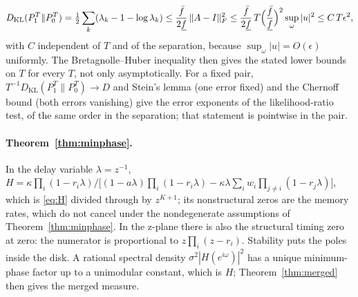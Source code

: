 \documentclass[12pt]{article}
\theoremstyle{definition}
\theoremstyle{remark}
\newcommand{\KL}{D_{\mathrm{KL}}}
\begin{document}
\[
\KL(P_1^T\|P_0^T)=\tfrac12\sum_k(\lambda_k-1-\log\lambda_k)\le\frac{\bar f}{2\underline f}\,\|A-I\|_F^2\le\frac{\bar f}{2\underline f}\,T\Bigl(\frac{\bar f}{\underline f}\Bigr)^2\sup_\omega|u|^2\le C\,T\epsilon^2,
\]
with $C$ independent of $T$ and of the separation, because $\sup_\omega|u|=O(\epsilon)$ uniformly. The Bretagnolle--Huber inequality \citep[Lemma 2.6]{tsybakov2009} then gives the stated lower bounds on $T$ for every $T$, not only asymptotically. For a fixed pair, $T^{-1}\KL(P_1^T\|P_0^T)\to D$ and Stein's lemma (one error fixed) and the Chernoff bound (both errors vanishing) give the error exponents of the likelihood-ratio test, of the same order in the separation; that statement is pointwise in the pair.


\paragraph{Theorem~\ref{thm:minphase}.} In the delay variable $\lambda=z^{-1}$, $H=\kappa\prod_i(1-r_i\lambda)/\bigl[(1-a\lambda)\prod_i(1-r_i\lambda)-\kappa\lambda\sum_iw_i\prod_{j\ne i}(1-r_j\lambda)\bigr]$, which is \eqref{eq:H} divided through by $z^{K+1}$; its nonstructural zeros are the memory rates, which do not cancel under the nondegenerate assumptions of Theorem~\ref{thm:minphase}. In the z-plane there is also the structural timing zero at zero: the numerator is proportional to $z\prod_i(z-r_i)$. Stability puts the poles inside the disk. A rational spectral density $\sigma^2|H(e^{i\omega})|^2$ has a unique minimum-phase factor up to a unimodular constant, which is $H$; Theorem~\ref{thm:merged} then gives the merged measure.
\end{document}
